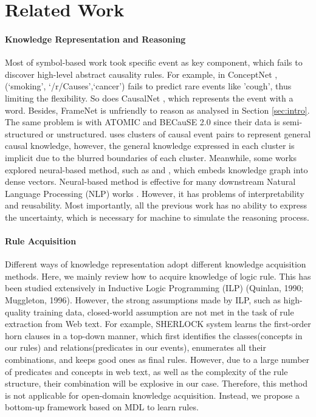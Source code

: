 \section{Related Work}
\label{sec:related}
\paragraph{Knowledge Representation and Reasoning}
Most of symbol-based work took specific event as key component, which fails to discover high-level abstract causality rules. For example, in ConceptNet \cite{Speer2016}, (`smoking', `/r/Causes',`cancer') fails to predict rare events like 'cough', thus limiting the flexibility. So does CausalNet \cite{Luo2016a}, which represents the event with a word.
Besides, FrameNet\cite{BakerCollinFandFillmoreCharlesJandLowe1997} is unfriendly to reason as analysed in Section \ref{sec:intro}. The same problem is with ATOMIC \cite{sap2018atomic} and  BECauSE 2.0 \cite{Dunietz2017} since their data is semi-structured or unstructured. \cite{Radinsky2012} uses clusters of causal event pairs to represent general causal knowledge, however, the general knowledge expressed in each cluster is implicit due to the blurred boundaries of each cluster.  Meanwhile, some works explored neural-based method, such as \cite{Bordes} and \cite{Li2016a}, which embeds knowledge graph into dense vectors. Neural-based method is effective for many downstream Natural Language Processing (NLP) works \cite{Wang2017}. However, it has problems of interpretability and reusability. Most importantly, all the previous work has no ability to express the uncertainty, which is necessary for machine to simulate the reasoning process.
\paragraph{Rule Acquisition} 
Different ways of knowledge representation adopt different knowledge acquisition methods.
Here, we mainly review how to acquire knowledge of logic rule. 
This has been studied extensively in Inductive Logic Programming (ILP) (Quinlan, 1990; Muggleton, 1996). However, the strong assumptions made by ILP, such as high-quality training data, closed-world assumption are not met in the task of rule extraction from Web text.
For example, SHERLOCK system \cite{Schoenmackers2010} learns the first-order horn clauses in a top-down manner, which first identifies the classes(concepts in our rules) and relations(predicates in our events), enumerates all their combinations, and keeps good ones as final rules. 
However, due to a large number of predicates and concepts in web text, as well as the complexity of the rule structure, their combination will be explosive in our case. Therefore, this method is not applicable for open-domain knowledge acquisition. Instead, we propose a bottom-up framework based on MDL to learn rules.

